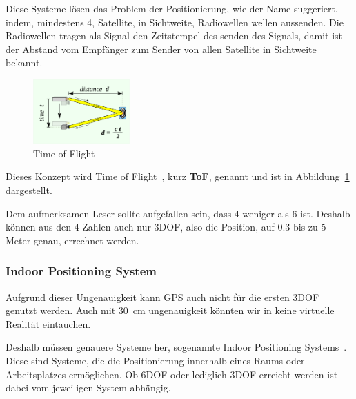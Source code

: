 Diese Systeme lösen das Problem der Positionierung, wie der Name suggeriert, indem, mindestens 4, Satellite, in Sichtweite, Radiowellen wellen aussenden.
Die Radiowellen tragen als Signal den Zeitstempel des senden des Signals, damit ist der Abstand vom Empfänger zum Sender von allen Satellite in Sichtweite bekannt.
\begin{figure}[ht!]
    \label{fig:ToF}
    \center
    \includegraphics[width={0.33\textwidth}]{../assets/img/time_of_flight}
    \caption{Time of Flight~\autocite{wikipedia-contributors-2023C}}
\end{figure}
Dieses Konzept wird Time of Flight~\autocite{wikipedia-contributors-2023C}, kurz \textbf{ToF}, genannt und ist in Abbildung~\ref{fig:ToF} dargestellt.

Dem aufmerksamen Leser sollte aufgefallen sein, dass 4 weniger als 6 ist.
Deshalb können aus den 4 Zahlen auch nur 3DOF, also die Position, auf 0.3 bis zu 5 Meter genau, errechnet werden.

\subsubsection{Indoor Positioning System}\label{subsubsec:indoor-positioning-system}
Aufgrund dieser Ungenauigkeit kann GPS auch nicht für die ersten 3DOF genutzt werden.
Auch mit 30~cm ungenauigkeit könnten wir in keine virtuelle Realität eintauchen.

Deshalb müssen genauere Systeme her, sogenannte Indoor Positioning Systems~\autocite{wikipedia-contributors-2023D}.
Diese sind Systeme, die die Positionierung innerhalb eines Raums oder Arbeitsplatzes ermöglichen.
Ob 6DOF oder lediglich 3DOF erreicht werden ist dabei vom jeweiligen System abhängig.

